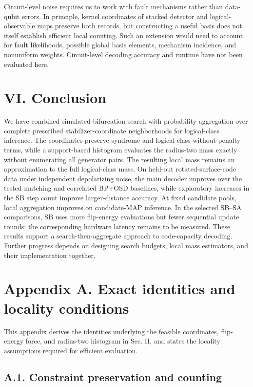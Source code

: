 \documentclass[
  10pt,
]{article}
\begin{document}
Circuit-level noise requires us to work with fault mechanisms rather
than data-qubit errors. In principle, kernel coordinates of stacked
detector and logical-observable maps preserve both records, but
constructing a useful basis does not itself establish efficient local
counting. Such an extension would need to account for fault likelihoods,
possible global basis elements, mechanism incidence, and nonuniform
weights. Circuit-level decoding accuracy and runtime have not been
evaluated here.

\section{VI. Conclusion}\label{vi.-conclusion}

We have combined simulated-bifurcation search with probability
aggregation over complete prescribed stabilizer-coordinate neighborhoods
for logical-class inference. The coordinates preserve syndrome and
logical class without penalty terms, while a support-based histogram
evaluates the radius-two mass exactly without enumerating all generator
pairs. The resulting local mass remains an approximation to the full
logical-class mass. On held-out rotated-surface-code data under
independent depolarizing noise, the main decoder improves over the
tested matching and correlated BP+OSD baselines, while exploratory
increases in the SB step count improve larger-distance accuracy. At
fixed candidate pools, local aggregation improves on candidate-MAP
inference. In the selected SB--SA comparisons, SB uses more flip-energy
evaluations but fewer sequential update rounds; the corresponding
hardware latency remains to be measured. These results support a
search-then-aggregate approach to code-capacity decoding. Further
progress depends on designing search budgets, local mass estimators, and
their implementation together.

\section{Appendix A. Exact identities and locality
conditions}\label{appendix-a.-exact-identities-and-locality-conditions}

This appendix derives the identities underlying the feasible
coordinates, flip-energy force, and radius-two histogram in Sec. II, and
states the locality assumptions required for efficient evaluation.

\subsection{A.1. Constraint preservation and
counting}\label{a.1.-constraint-preservation-and-counting}
\end{document}
